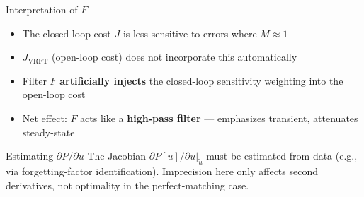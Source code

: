 \documentclass[hyperref={pdfpagemode=FullScreen},aspectratio=169]{beamer}
\newcommand{\highlight}[1]{{\color{accentgreen!70!black}\textbf{#1}}}
\newcommand{\JJ}{J_{\mathrm{VRFT}}}
\begin{document}
\begin{frame}
      \begin{exampleblock}{Interpretation of $F$}
        \begin{itemize}
          \item The closed-loop cost $J$ is less sensitive to errors where $M \approx 1$
          \item $\JJ$ (open-loop cost) does not incorporate this automatically
          \item Filter $F$ \highlight{artificially injects} the closed-loop sensitivity weighting into the open-loop cost
          \item Net effect: $F$ acts like a \textbf{high-pass filter} --- emphasizes transient, attenuates steady-state
        \end{itemize}
      \end{exampleblock}
      \vspace{0.4em}
      \begin{alertblock}{Estimating $\partial P / \partial u$}
        The Jacobian $\partial P[u]/\partial u|_{\tilde{u}}$ must be estimated from data (e.g., via forgetting-factor identification). Imprecision here only affects second derivatives, not optimality in the perfect-matching case.
      \end{alertblock}
\end{frame}
\end{document}
